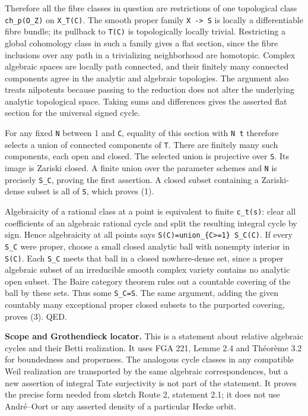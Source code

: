 \documentclass[11pt,a4paper]{article}
\theoremstyle{definition}
\begin{document}
Therefore all the fibre classes in question are restrictions of one
topological class \texttt{ch\_p(O\_Z)} on \texttt{X\_T(C)}. The smooth
proper family \texttt{X\ -\textgreater{}\ S} is locally a differentiable
fibre bundle; its pullback to \texttt{T(C)} is topologically locally
trivial. Restricting a global cohomology class in such a family gives a
flat section, since the fibre inclusions over any path in a trivializing
neighborhood are homotopic. Complex algebraic spaces are locally path
connected, and their finitely many connected components agree in the
analytic and algebraic topologies. The argument also treats nilpotents
because passing to the reduction does not alter the underlying analytic
topological space. Taking sums and differences gives the asserted flat
section for the universal signed cycle.

For any fixed \texttt{N} between 1 and \texttt{C}, equality of this
section with \texttt{N\ t} therefore selects a union of connected
components of \texttt{T}. There are finitely many such components, each
open and closed. The selected union is projective over \texttt{S}. Its
image is Zariski closed. A finite union over the parameter schemes and
\texttt{N} is precisely \texttt{S\_C}, proving the first assertion. A
closed subset containing a Zariski-dense subset is all of \texttt{S},
which proves (1).

Algebraicity of a rational class at a point is equivalent to finite
\texttt{c\_t(s)}: clear all coefficients of an algebraic rational cycle
and split the resulting integral cycle by sign. Hence algebraicity at
all points says \texttt{S(C)=union\_\{C\textgreater{}=1\}\ S\_C(C)}. If
every \texttt{S\_C} were proper, choose a small closed analytic ball
with nonempty interior in \texttt{S(C)}. Each \texttt{S\_C} meets that
ball in a closed nowhere-dense set, since a proper algebraic subset of
an irreducible smooth complex variety contains no analytic open subset.
The Baire category theorem rules out a countable covering of the ball by
these sets. Thus some \texttt{S\_C=S}. The same argument, adding the
given countably many exceptional proper closed subsets to the purported
covering, proves (3). QED.

\textbf{Scope and Grothendieck locator.} This is a statement about
relative algebraic cycles and their Betti realization. It uses FGA 221,
Lemme 2.4 and Théorème 3.2 for boundedness and properness. The analogous
cycle classes in any compatible Weil realization are transported by the
same algebraic correspondences, but a new assertion of integral Tate
surjectivity is not part of the statement. It proves the precise form
needed from sketch Route 2, statement 2.1; it does not use André--Oort
or any asserted density of a particular Hecke orbit.
\end{document}
